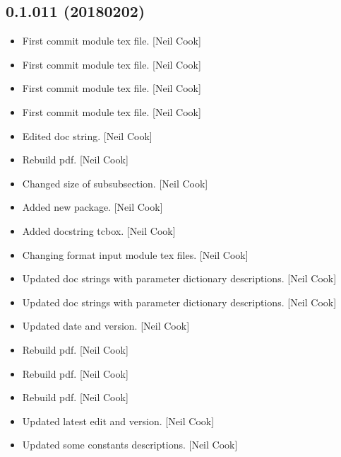 \documentclass[a4paper,10pt,english]{report}
\begin{document}
\subsection{0.1.011 (2018\sphinxhyphen{}02\sphinxhyphen{}02)}
\label{\detokenize{misc/changelog:id511}}\begin{itemize}
\item {} 
First commit \sphinxhyphen{} module tex file. {[}Neil Cook{]}

\item {} 
First commit \sphinxhyphen{} module tex file. {[}Neil Cook{]}

\item {} 
First commit \sphinxhyphen{} module tex file. {[}Neil Cook{]}

\item {} 
First commit \sphinxhyphen{} module tex file. {[}Neil Cook{]}

\item {} 
Edited doc string. {[}Neil Cook{]}

\item {} 
Rebuild pdf. {[}Neil Cook{]}

\item {} 
Changed size of subsubsection. {[}Neil Cook{]}

\item {} 
Added new package. {[}Neil Cook{]}

\item {} 
Added docstring tcbox. {[}Neil Cook{]}

\item {} 
Changing format input module tex files. {[}Neil Cook{]}

\item {} 
Updated doc strings with parameter dictionary descriptions. {[}Neil
Cook{]}

\item {} 
Updated doc strings with parameter dictionary descriptions. {[}Neil
Cook{]}

\item {} 
Updated date and version. {[}Neil Cook{]}

\item {} 
Rebuild pdf. {[}Neil Cook{]}

\item {} 
Rebuild pdf. {[}Neil Cook{]}

\item {} 
Rebuild pdf. {[}Neil Cook{]}

\item {} 
Updated latest edit and version. {[}Neil Cook{]}

\item {} 
Updated some constants descriptions. {[}Neil Cook{]}

\end{itemize}
\end{document}
